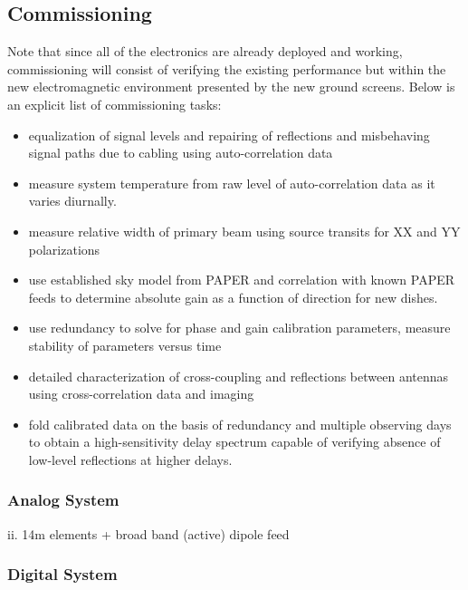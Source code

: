 \documentclass[preprint]{aastex}
\begin{document}
\vspace{-0.25in}
\subsection{Commissioning}
\vspace{-6pt}
Note that since all of the electronics are already deployed and working, commissioning will consist of verifying the existing performance but within the new electromagnetic environment presented by the new ground screens.  Below is
an explicit list of commissioning tasks:
\begin{itemize}[noitemsep,nolistsep]
\item equalization of signal levels and repairing of reflections and misbehaving signal paths due to cabling using auto-correlation data 
\item measure system temperature from raw level of auto-correlation data as it varies diurnally.
\item measure relative width of primary beam using source transits for XX and YY polarizations 
\item use established sky model from PAPER and correlation with known PAPER feeds to 
determine absolute gain as a function of direction for new dishes. 
\item use redundancy to solve for phase and gain calibration parameters, measure stability of parameters versus 
time 
\item detailed characterization of cross-coupling and reflections between antennas using cross-correlation data and imaging 
\item fold calibrated data on the basis of redundancy and multiple observing days to obtain a high-sensitivity delay spectrum capable of verifying absence of low-level reflections at higher delays. 
\end{itemize}





\subsubsection{Analog System}
ii. 14m elements + broad band (active) dipole feed

\subsubsection{Digital System}
\end{document}

